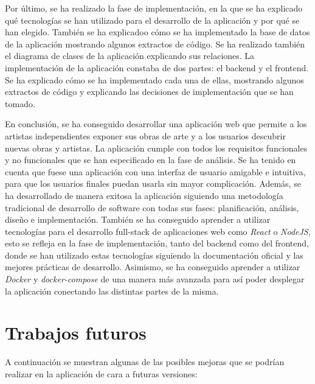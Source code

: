 \vspace{0.5cm}

Por último, se ha realizado la fase de implementación, en la que se ha explicado qué
tecnologías se han utilizado para el desarrollo de la aplicación y por qué se han
elegido. También se ha explicadoo cómo se ha implementado la base de datos de la aplicación
mostrando algunos extractos de código. Se ha realizado también el diagrama de clases
de la aplicación explicando sus relaciones. La implementación de la aplicación constaba
de dos partes: el backend y el frontend. Se ha explicado cómo se ha implementado cada una
de ellas, mostrando algunos extractos de código y explicando las decisiones de
implementación que se han tomado.

\vspace{0.5cm}

En conclusión, se ha conseguido desarrollar una aplicación web que permite a los artistas
independientes exponer sus obras de arte y a los usuarios descubrir nuevas obras y artistas.
La aplicación cumple con todos los requisitos funcionales y no funcionales que se han
especificado en la fase de análisis. Se ha tenido en cuenta que fuese una aplicación
con una interfaz de usuario amigable e intuitiva, para que los usuarios finales puedan
usarla sin mayor complicación. Además, se ha desarrollado de manera exitosa la
aplicación siguiendo una metodología tradicional de desarrollo de software con todas
sus fases: planificación, análisis, diseño e implementación. También se ha conseguido
aprender a utilizar tecnologías para el desarrollo full-stack de aplicaciones web como
\textit{React} o \textit{NodeJS}, esto se refleja en la fase de implementación, tanto
del backend como del frontend, donde se han utilizado estas tecnologías siguiendo la
documentación oficial y las mejores prácticas de desarrollo. Asimismo, se ha conseguido
aprender a utilizar \textit{Docker} y \textit{docker-compose} de una manera más avanzada
para así poder desplegar la aplicación conectando las distintas partes de la misma.

\section{Trabajos futuros}

A continuación se muestran algunas de las posibles mejoras que se podrían realizar en
la aplicación de cara a futuras versiones:


